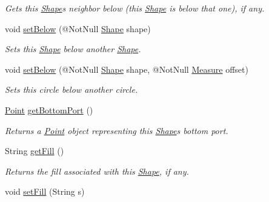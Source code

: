 \begin{DoxyCompactItemize}
\begin{DoxyCompactList}\small\item\em Gets this \hyperlink{classcom_1_1aarrelaakso_1_1drawl_1_1_shape}{Shape}\textquotesingle{}s neighbor below (this \hyperlink{classcom_1_1aarrelaakso_1_1drawl_1_1_shape}{Shape} is below that one), if any. \end{DoxyCompactList}\item 
void \hyperlink{classcom_1_1aarrelaakso_1_1drawl_1_1_shape_aabbe6165d905a690a38917443bf6e5b5}{set\+Below} (@Not\+Null \hyperlink{classcom_1_1aarrelaakso_1_1drawl_1_1_shape}{Shape} shape)
\begin{DoxyCompactList}\small\item\em Sets this \hyperlink{classcom_1_1aarrelaakso_1_1drawl_1_1_shape}{Shape} below another \hyperlink{classcom_1_1aarrelaakso_1_1drawl_1_1_shape}{Shape}. \end{DoxyCompactList}\item 
void \hyperlink{classcom_1_1aarrelaakso_1_1drawl_1_1_shape_a9e6a74a094d67337b42a626d8aa167a8}{set\+Below} (@Not\+Null \hyperlink{classcom_1_1aarrelaakso_1_1drawl_1_1_shape}{Shape} shape, @Not\+Null \hyperlink{classcom_1_1aarrelaakso_1_1drawl_1_1_measure}{Measure} offset)
\begin{DoxyCompactList}\small\item\em Sets this circle below another circle. \end{DoxyCompactList}\item 
\hyperlink{classcom_1_1aarrelaakso_1_1drawl_1_1_point}{Point} \hyperlink{classcom_1_1aarrelaakso_1_1drawl_1_1_shape_aba14efe9a16c0808580963c66b171082}{get\+Bottom\+Port} ()
\begin{DoxyCompactList}\small\item\em Returns a \hyperlink{classcom_1_1aarrelaakso_1_1drawl_1_1_point}{Point} object representing this \hyperlink{classcom_1_1aarrelaakso_1_1drawl_1_1_shape}{Shape}\textquotesingle{}s bottom port. \end{DoxyCompactList}\item 
String \hyperlink{classcom_1_1aarrelaakso_1_1drawl_1_1_shape_a0d9a33a3e151aaceeec140bea343a650}{get\+Fill} ()
\begin{DoxyCompactList}\small\item\em Returns the fill associated with this \hyperlink{classcom_1_1aarrelaakso_1_1drawl_1_1_shape}{Shape}, if any. \end{DoxyCompactList}\item 
void \hyperlink{classcom_1_1aarrelaakso_1_1drawl_1_1_shape_a2a2868c85bfbf4d2940d929950001b3d}{set\+Fill} (String s)

\end{DoxyCompactItemize}
